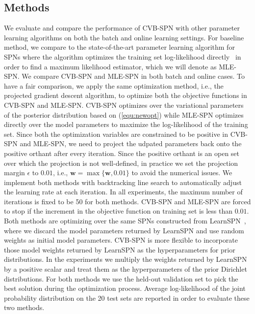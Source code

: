 \documentclass{article} %
\theoremstyle{definition}
\begin{document}
\subsection{Methods}
We evaluate and compare the performance of CVB-SPN with other parameter learning algorithms on both the batch and online learning settings. For baseline method, we compare to the state-of-the-art parameter learning algorithm for SPNs where the algorithm optimizes the training set log-likelihood directly~\cite{poon2011sum} in order to find a maximum likelihood estimator, which we will denote as MLE-SPN. We compare CVB-SPN and MLE-SPN in both batch and online cases. To have a fair comparison, we apply the same optimization method, i.e., the projected gradient descent algorithm, to optimize both the objective functions in CVB-SPN and MLE-SPN. CVB-SPN optimizes over the variational parameters of the posterior distribution based on (\ref{equ:newopt}) while MLE-SPN optimizes directly over the model parameters to maximize the log-likelihood of the training set. Since both the optimization variables are constrained to be positive in CVB-SPN and MLE-SPN, we need to project the udpated parameters back onto the positive orthant after every iteration. Since the positive orthant is an open set over which the projection is not well-defined, in practice we set the projection margin $\epsilon$ to $0.01$, i.e., $\mathbf{w} = \max\{\mathbf{w}, 0.01\}$ to avoid the numerical issues. We implement both methods with backtracking line search to automatically adjust the learning rate at each iteration. In all experiments, the maximum number of iterations is fixed to be 50 for both methods. CVB-SPN and MLE-SPN are forced to stop if the increment in the objective function on training set is less than $0.01$. Both methods are optimizing over the same SPNs constructed from LearnSPN~\cite{gens2013learning}, where we discard the model parameters returned by LearnSPN and use random weights as initial model parameters. CVB-SPN is more flexible to incorporate those model weights returned by LearnSPN as the hyperparameters for prior distributions. In the experiments we multiply the weights returned by LearnSPN by a positive scalar and treat them as the hyperparameters of the prior Dirichlet distributions. For both methods we use the held-out validation set to pick the best solution during the optimization process. Average log-likelihood of the joint probability distribution on the 20 test sets are reported in order to evaluate these two methods. 
\end{document}
